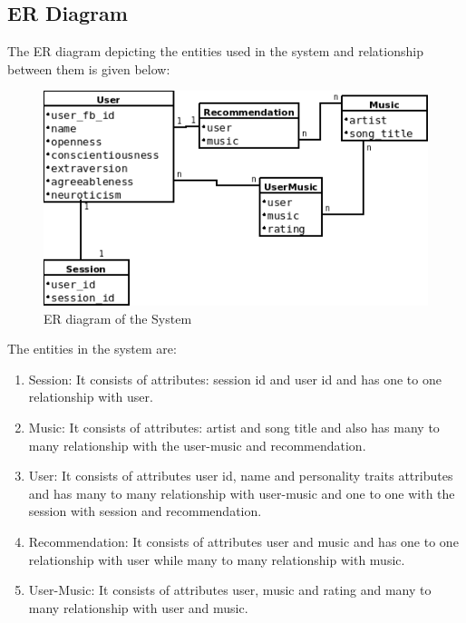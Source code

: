 \subsection{ER Diagram}
The  ER diagram depicting the entities used in the system and relationship between them is given below:
\begin{figure}[!ht]
\centering
\includegraphics[width = 15 cm]{fig/er.png}
\caption{ER diagram of the System}
\label{fig:er}
\end{figure}
The entities in the system are:
\begin{enumerate}
	\item Session: It consists of attributes: session id and user id and has one to one relationship with user.
	\item Music: It consists of attributes: artist and song title and also has  many to many relationship with the user-music and recommendation.
	\item User: It consists of attributes user id, name and personality traits attributes and has  many to  many relationship with user-music and one to one with the session with session and recommendation.
	\item Recommendation: It consists of attributes user and music and has one to one relationship with user while many to many relationship with music.

	\item User-Music: It consists of attributes user, music and rating and many to many relationship with user and music.
\end{enumerate}
\newpage

